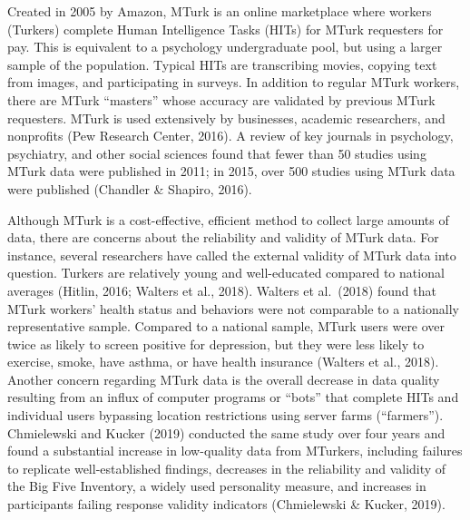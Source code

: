 \documentclass[
  11pt,
]{book}
\begin{document}
Created in 2005 by Amazon, MTurk is an online marketplace where workers (Turkers) complete Human Intelligence Tasks (HITs) for MTurk requesters for pay. This is equivalent to a psychology undergraduate pool, but using a larger sample of the population. Typical HITs are transcribing movies, copying text from images, and participating in surveys. In addition to regular MTurk workers, there are MTurk ``masters'' whose accuracy are validated by previous MTurk requesters. MTurk is used extensively by businesses, academic researchers, and nonprofits (Pew Research Center, 2016). A review of key journals in psychology, psychiatry, and other social sciences found that fewer than 50 studies using MTurk data were published in 2011; in 2015, over 500 studies using MTurk data were published (Chandler \& Shapiro, 2016).

Although MTurk is a cost-effective, efficient method to collect large amounts of data, there are concerns about the reliability and validity of MTurk data. For instance, several researchers have called the external validity of MTurk data into question. Turkers are relatively young and well-educated compared to national averages (Hitlin, 2016; Walters et al., 2018). Walters et al.~(2018) found that MTurk workers' health status and behaviors were not comparable to a nationally representative sample. Compared to a national sample, MTurk users were over twice as likely to screen positive for depression, but they were less likely to exercise, smoke, have asthma, or have health insurance (Walters et al., 2018). Another concern regarding MTurk data is the overall decrease in data quality resulting from an influx of computer programs or ``bots'' that complete HITs and individual users bypassing location restrictions using server farms (``farmers''). Chmielewski and Kucker (2019) conducted the same study over four years and found a substantial increase in low-quality data from MTurkers, including failures to replicate well-established findings, decreases in the reliability and validity of the Big Five Inventory, a widely used personality measure, and increases in participants failing response validity indicators (Chmielewski \& Kucker, 2019).
\end{document}
